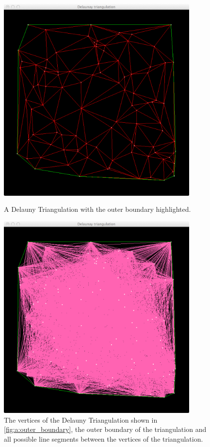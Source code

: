 \begin{figure}
	\begin{minipage}[t]{0.45\textwidth}
		\centering
		\includegraphics[width=0.9\textwidth]{./img/a_outer_boundary}
		\caption{A Delauny Triangulation with the outer boundary highlighted.}
		\label{fig:a:outer_boundary}		
	\end{minipage}
	\hspace{0.1\textwidth}
	\begin{minipage}[t]{0.45\textwidth}
		\centering
		\includegraphics[width=0.9\textwidth]{./img/a_convex_hull}
		\caption{The vertices of the Delauny Triangulation shown in \autoref{fig:a:outer_boundary}, the outer boundary of the triangulation and all possible line segments between the vertices of the triangulation.}
		\label{fig:a:convex_hull}		
	\end{minipage}
\end{figure}
